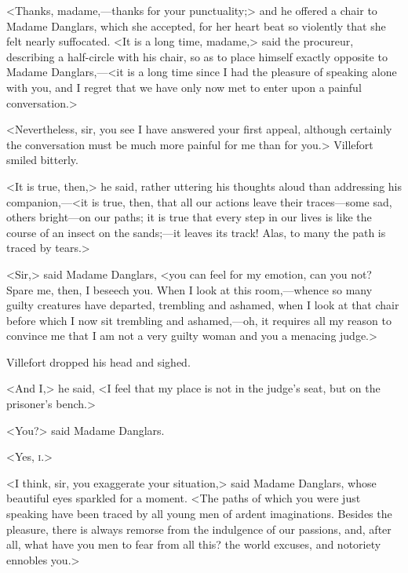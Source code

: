  <Thanks, madame,—thanks for your punctuality;> and he offered a chair to Madame Danglars, which she accepted, for her heart beat so violently that she felt nearly suffocated.  <It is a long time, madame,> said the procureur, describing a half-circle with his chair, so as to place himself exactly opposite to Madame Danglars,—<it is a long time since I had the pleasure of speaking alone with you, and I regret that we have only now met to enter upon a painful conversation.> 

 <Nevertheless, sir, you see I have answered your first appeal, although certainly the conversation must be much more painful for me than for you.> Villefort smiled bitterly. 

 <It is true, then,> he said, rather uttering his thoughts aloud than addressing his companion,—<it is true, then, that all our actions leave their traces—some sad, others bright—on our paths; it is true that every step in our lives is like the course of an insect on the sands;—it leaves its track! Alas, to many the path is traced by tears.> 

 <Sir,> said Madame Danglars, <you can feel for my emotion, can you not? Spare me, then, I beseech you. When I look at this room,—whence so many guilty creatures have departed, trembling and ashamed, when I look at that chair before which I now sit trembling and ashamed,—oh, it requires all my reason to convince me that I am not a very guilty woman and you a menacing judge.> 

 Villefort dropped his head and sighed. 

 <And I,> he said, <I feel that my place is not in the judge's seat, but on the prisoner's bench.>

<You?> said Madame Danglars. 

 <Yes, \textsc{i.}> 

 <I think, sir, you exaggerate your situation,> said Madame Danglars, whose beautiful eyes sparkled for a moment. <The paths of which you were just speaking have been traced by all young men of ardent imaginations. Besides the pleasure, there is always remorse from the indulgence of our passions, and, after all, what have you men to fear from all this? the world excuses, and notoriety ennobles you.> 

